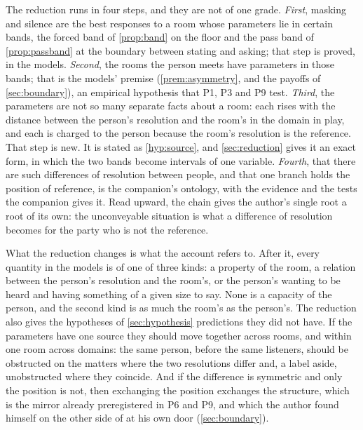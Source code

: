 The reduction runs in four steps, and they are not of one grade. \emph{First}, masking and silence are the best responses to a room whose parameters lie in certain bands, the forced band of \autoref{prop:band} on the floor and the pass band of \autoref{prop:passband} at the boundary between stating and asking; that step is proved, in the models. \emph{Second}, the rooms the person meets have parameters in those bands; that is the models' premise (\autoref{prem:asymmetry}, and the payoffs of \autoref{sec:boundary}), an empirical hypothesis that P1, P3 and P9 test. \emph{Third}, the parameters are not so many separate facts about a room: each rises with the distance between the person's resolution and the room's in the domain in play, and each is charged to the person because the room's resolution is the reference. That step is new. It is stated as \autoref{hyp:source}, and \autoref{sec:reduction} gives it an exact form, in which the two bands become intervals of one variable. \emph{Fourth}, that there are such differences of resolution between people, and that one branch holds the position of reference, is the companion's ontology, with the evidence and the tests the companion gives it. Read upward, the chain gives the author's single root a root of its own: the unconveyable situation is what a difference of resolution becomes for the party who is not the reference.

What the reduction changes is what the account refers to. After it, every quantity in the models is of one of three kinds: a property of the room, a relation between the person's resolution and the room's, or the person's wanting to be heard and having something of a given size to say. None is a capacity of the person, and the second kind is as much the room's as the person's. The reduction also gives the hypotheses of \autoref{sec:hypothesis} predictions they did not have. If the parameters have one source they should move together across rooms, and within one room across domains: the same person, before the same listeners, should be obstructed on the matters where the two resolutions differ and, a label aside, unobstructed where they coincide. And if the difference is symmetric and only the position is not, then exchanging the position exchanges the structure, which is the mirror already preregistered in P6 and P9, and which the author found himself on the other side of at his own door (\autoref{sec:boundary}).

